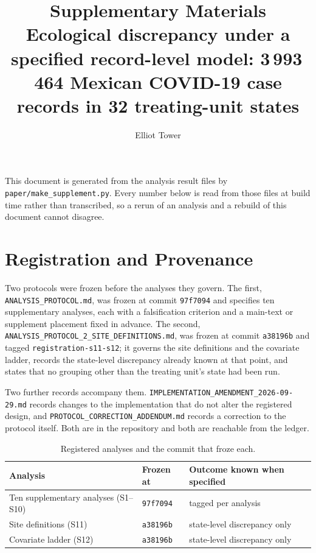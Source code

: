 \documentclass[11pt]{article}
\title{Supplementary Materials\\[6pt]
\large Ecological discrepancy under a specified record-level model:
3\,993\,464 Mexican COVID-19 case records in 32 treating-unit states}
\author{Elliot Tower}
\date{}
\begin{document}
\maketitle

\setcounter{section}{0}
\renewcommand{\thesection}{Supplement~\Alph{section}}

This document is generated from the analysis result files by
\texttt{paper/make\_supplement.py}.  Every number below is read from those
files at build time rather than transcribed, so a rerun of an analysis and a
rebuild of this document cannot disagree.

\section{Registration and Provenance}
\label{supp:registration}

Two protocols were frozen before the analyses they govern.  The first,
\texttt{ANALYSIS\_PROTOCOL.md}, was frozen at commit \texttt{97f7094} and
specifies ten supplementary analyses, each with a falsification criterion and
a main-text or supplement placement fixed in advance.  The second,
\texttt{ANALYSIS\_PROTOCOL\_2\_}\-\texttt{SITE\_DEFINITIONS.md}, was frozen at commit
\texttt{a38196b} and tagged \texttt{registration-s11-s12}; it governs the
site definitions and the covariate ladder, records the state-level discrepancy
already known at that point, and states that no grouping other than the
treating unit's state had been run.

\begin{sloppypar}
Two further records accompany them.
\texttt{IMPLEMENTATION\_AMENDMENT\_2026-09-29.md} records changes to the
implementation that do not alter the registered design, and
\texttt{PROTOCOL\_CORRECTION\_ADDENDUM.md} records a correction to the
protocol itself.  Both are in the repository and both are reachable from the
ledger.
\end{sloppypar}

\begin{table}[h]
\centering
\caption{Registered analyses and the commit that froze each.}
\vspace{0.5\baselineskip}
\begin{tabular}{lll}
\toprule
Analysis & Frozen at & Outcome known when specified \\
\midrule
Ten supplementary analyses (S1--S10) & \texttt{97f7094} & tagged per analysis \\
Site definitions (S11) & \texttt{a38196b} & state-level discrepancy only \\
Covariate ladder (S12) & \texttt{a38196b} & state-level discrepancy only \\
\bottomrule
\end{tabular}
\end{table}
\end{document}
